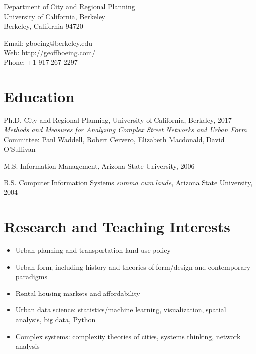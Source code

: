 \documentclass{academiccv}
\begin{document}
\raggedright

\namefont{\myname}

\vspace{1em}
\begin{minipage}[t]{0.495\textwidth}
  Department of City and Regional Planning \\
  University of California, Berkeley \\
  Berkeley, California 94720
\end{minipage}
\begin{minipage}[t]{0.495\textwidth}
  Email: gboeing@berkeley.edu \\
  Web: http://geoffboeing.com/ \\
  Phone: +1 917 267 2297
\end{minipage}
\vspace{0.5em}



\section*{Education}

\begin{tablist}
\item[Ph.D.] \tab City and Regional Planning, University of California, Berkeley, 2017 \\
                  \emph{Methods and Measures for Analyzing Complex Street Networks and Urban Form} \\
                  Committee: Paul Waddell, Robert Cervero, Elizabeth Macdonald, David O'Sullivan
\item[M.S.]  \tab Information Management, Arizona State University, 2006
\item[B.S.]  \tab Computer Information Systems \emph{summa cum laude}, Arizona State University, 2004
\end{tablist}



\section*{Research and Teaching Interests}

\begin{itemize}
\item Urban planning and transportation-land use policy
\item Urban form, including history and theories of form/design and contemporary paradigms
\item Rental housing markets and affordability
\item Urban data science: statistics/machine learning, visualization, spatial analysis, big data, Python
\item Complex systems: complexity theories of cities, systems thinking, network analysis
\end{itemize}
\end{document}
